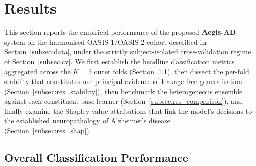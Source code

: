 %
%
%

\section{Results}
\label{sec:results}

This section reports the empirical performance of the proposed \textbf{Aegis-AD} system on the harmonised OASIS-1/OASIS-2 cohort described in Section~\ref{subsec:data}, under the strictly subject-isolated cross-validation regime of Section~\ref{subsec:cv}. We first establish the headline classification metrics aggregated across the $K = 5$ outer folds (Section~\ref{subsec:res_overall}), then dissect the per-fold stability that constitutes our principal evidence of leakage-free generalisation (Section~\ref{subsec:res_stability}), then benchmark the heterogeneous ensemble against each constituent base learner (Section~\ref{subsec:res_comparison}), and finally examine the Shapley-value attributions that link the model's decisions to the established neuropathology of Alzheimer's disease (Section~\ref{subsec:res_shap}).

\subsection{Overall Classification Performance}
\label{subsec:res_overall}

